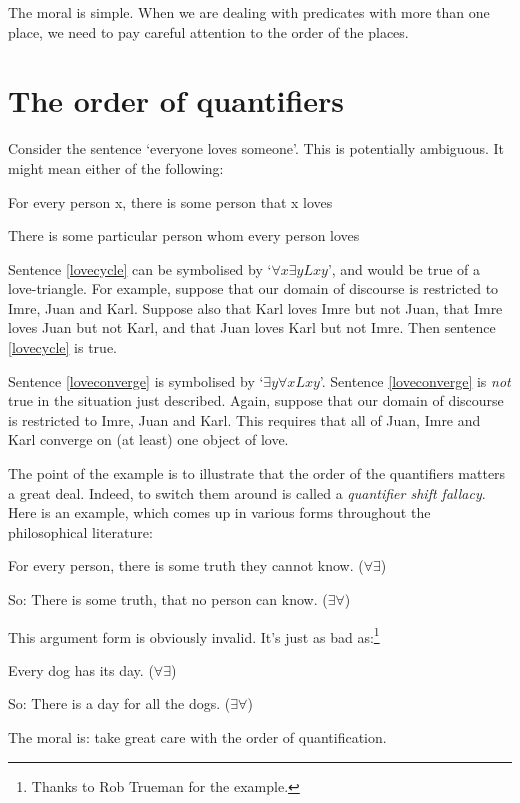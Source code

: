The moral is simple. When we are dealing with predicates with more than one place, we need to pay careful attention to the order of the places.


\section{The order of quantifiers}
Consider the sentence `everyone loves someone'. This is potentially ambiguous. It might mean either of the following:
	\begin{earg}
		\item[\ex{lovecycle}] For every person x, there is some person that x loves
		\item[\ex{loveconverge}] There is some particular person whom every person loves
	\end{earg}
Sentence \ref{lovecycle} can be symbolised by `$\forall x \exists y Lxy$', and would be true of a love-triangle. For example, suppose that our domain of discourse is restricted to Imre, Juan and Karl. Suppose also that Karl loves Imre but not Juan, that Imre loves Juan but not Karl, and that Juan loves Karl but not Imre. Then sentence \ref{lovecycle} is true. 

Sentence \ref{loveconverge} is symbolised by `$\exists y \forall x Lxy$'. Sentence \ref{loveconverge} is \emph{not} true in the situation just described. Again, suppose that our domain of discourse is restricted to Imre, Juan and Karl. This requires that all of Juan, Imre and Karl converge on (at least) one object of love. 

The point of the example is to illustrate that the order of the quantifiers matters a great deal. Indeed, to switch them around is called a \emph{quantifier shift fallacy}. Here is an example, which comes up in various forms throughout the philosophical literature:
	\begin{earg}
		\item[] For every person, there is some truth they cannot know. \hfill ($\forall \exists$)
		\item[So:] There is some truth, that no person can know. \hfill ($\exists \forall$)
	\end{earg}
This argument form is obviously invalid. It's just as bad as:\footnote{Thanks to Rob Trueman for the example.}
	\begin{earg}
		\item[] Every dog has its day. \hfill ($\forall \exists$)
		\item[So:] There is a day for all the dogs. \hfill ($\exists \forall$)
	\end{earg}
The moral is: take great care with the order of quantification.

